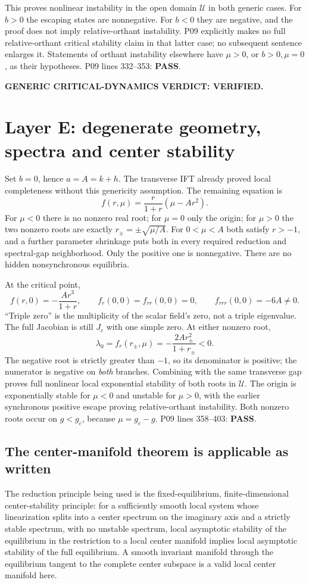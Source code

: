 \documentclass[11pt]{article}
\newcommand{\U}{\mathcal U}
\newcommand{\lin}[1]{P09 lines #1}
\newcommand{\pass}{\textbf{PASS}}
\begin{document}
This proves nonlinear instability in the open domain $\U$ in both generic
cases. For $b>0$ the escaping states are nonnegative. For $b<0$ they are
negative, and the proof does not imply relative-orthant instability.
P09 explicitly makes no full relative-orthant critical stability claim in
that latter case; no subsequent sentence enlarges it. Statements of
orthant instability elsewhere have $\mu>0$, or $b>0,\mu=0$, as their
hypotheses. \lin{332--353}: \pass.

\textbf{GENERIC CRITICAL-DYNAMICS VERDICT: VERIFIED.}

\section{Layer E: degenerate geometry, spectra and center stability}
\label{sec:degenerate}
Set $b=0$, hence $a=A=k+h$. The transverse IFT already proved local
completeness without this genericity assumption. The remaining equation is
\[
 f(r,\mu)=\frac{r}{1+r}(\mu-Ar^2).
\]
For $\mu<0$ there is no nonzero real root; for $\mu=0$ only the origin;
for $\mu>0$ the two nonzero roots are exactly $r_\pm=\pm\sqrt{\mu/A}$.
For $0<\mu<A$ both satisfy $r>-1$, and a further parameter shrinkage puts
both in every required reduction and spectral-gap neighborhood. Only the
positive one is nonnegative. There are no hidden nonsynchronous equilibria.

At the critical point,
\[
 f(r,0)=-\frac{Ar^3}{1+r},\qquad
 f_r(0,0)=f_{rr}(0,0)=0,\qquad f_{rrr}(0,0)=-6A\ne0.
\]
``Triple zero'' is the multiplicity of the scalar field's zero, not a
triple eigenvalue. The full Jacobian is still $J_c$ with one simple zero.
At either nonzero root,
\[
 \lambda_0=f_r(r_\pm,\mu)=-\frac{2Ar_\pm^2}{1+r_\pm}<0.
\]
The negative root is strictly greater than $-1$, so its denominator is
positive; the numerator is negative on \emph{both} branches. Combining
with the same transverse gap proves full nonlinear local exponential
stability of both roots in $\U$. The origin is exponentially stable for
$\mu<0$ and unstable for $\mu>0$, with the earlier synchronous positive
escape proving relative-orthant instability. Both nonzero roots occur
on $g<g_c$, because $\mu=g_c-g$. \lin{358--403}: \pass.

\subsection{The center-manifold theorem is applicable as written}
The reduction principle being used is the fixed-equilibrium,
finite-dimensional center-stability principle: for a sufficiently smooth
local system whose linearization splits into a center spectrum on the
imaginary axis and a strictly stable spectrum, with no unstable spectrum,
local asymptotic stability of the equilibrium in the restriction to a
local center manifold implies local asymptotic stability of the full
equilibrium. A smooth invariant manifold through the equilibrium tangent
to the complete center subspace is a valid local center manifold here.
\end{document}
